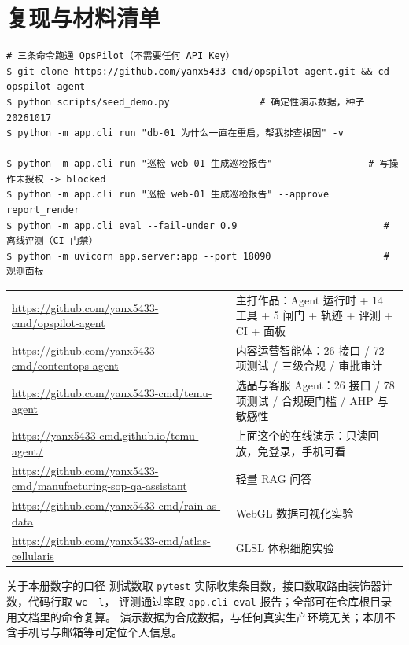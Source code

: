 \documentclass[10.5pt,a4paper]{article}
\newcommand{\Ntools}{14}
\newcommand{\Ngate}{5}
\begin{document}
\section{复现与材料清单}

\begin{lstlisting}[style=sh]
# 三条命令跑通 OpsPilot（不需要任何 API Key）
$ git clone https://github.com/yanx5433-cmd/opspilot-agent.git && cd opspilot-agent
$ python scripts/seed_demo.py                # 确定性演示数据，种子 20261017
$ python -m app.cli run "db-01 为什么一直在重启，帮我排查根因" -v

$ python -m app.cli run "巡检 web-01 生成巡检报告"                 # 写操作未授权 -> blocked
$ python -m app.cli run "巡检 web-01 生成巡检报告" --approve report_render
$ python -m app.cli eval --fail-under 0.9                          # 离线评测（CI 门禁）
$ python -m uvicorn app.server:app --port 18090                    # 观测面板
\end{lstlisting}

\begin{tabularx}{\textwidth}{@{}L{4.3cm}X@{}}
\url{https://github.com/yanx5433-cmd/opspilot-agent} & 主打作品：Agent 运行时 + \Ntools{} 工具 + \Ngate{} 闸门 + 轨迹 + 评测 + CI + 面板 \\
\url{https://github.com/yanx5433-cmd/contentops-agent} & 内容运营智能体：26 接口 / 72 项测试 / 三级合规 / 审批审计 \\
\url{https://github.com/yanx5433-cmd/temu-agent} & 选品与客服 Agent：26 接口 / 78 项测试 / 合规硬门槛 / AHP 与敏感性 \\
\url{https://yanx5433-cmd.github.io/temu-agent/} & 上面这个的在线演示：只读回放，免登录，手机可看 \\
\url{https://github.com/yanx5433-cmd/manufacturing-sop-qa-assistant} & 轻量 RAG 问答 \\
\url{https://github.com/yanx5433-cmd/rain-as-data} & WebGL 数据可视化实验 \\
\url{https://github.com/yanx5433-cmd/atlas-cellularis} & GLSL 体积细胞实验 \\
\end{tabularx}

\vspace{4pt}
\begin{keybox}{关于本册数字的口径}
测试数取 \texttt{pytest} 实际收集条目数，接口数取路由装饰器计数，代码行取 \texttt{wc -l}，
评测通过率取 \texttt{app.cli eval} 报告；全部可在仓库根目录用文档里的命令复算。
演示数据为合成数据，与任何真实生产环境无关；本册不含手机号与邮箱等可定位个人信息。
\end{keybox}
\end{document}
